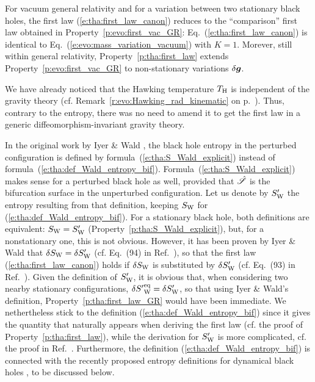 \begin{prop}
\label{p:tha:first_law_GR}
For vacuum general relativity and for a variation between two stationary black holes,
the first law (\ref{e:tha:first_law_canon}) reduces
to the ``comparison'' first law obtained in Property~\ref{p:evo:first_vac_GR}:
Eq.~(\ref{e:tha:first_law_canon}) is identical to
Eq.~(\ref{e:evo:mass_variation_vacuum}) with $K=1$.
Morever, still within general relativity, Property~\ref{p:tha:first_law} extends
Property~\ref{p:evo:first_vac_GR} to non-stationary variations
$\delta\bm{g}$.
\end{prop}

\begin{remark}
We have already noticed that the Hawking temperature $T_{\rm H}$
is independent of the gravity theory
(cf. Remark~\ref{r:evo:Hawking_rad_kinematic} on p.~\pageref{r:evo:Hawking_rad_kinematic}).
Thus, contrary to the entropy, there was no need to amend it to get the first law
in a generic diffeomorphism-invariant gravity theory.
\end{remark}

\begin{remark}
In the original work by Iyer \& Wald \cite{IyerW94},
the black hole entropy in the perturbed
configuration is defined by formula~(\ref{e:tha:S_Wald_explicit})
instead of formula~(\ref{e:tha:def_Wald_entropy_bif}).
Formula~(\ref{e:tha:S_Wald_explicit}) makes
sense for a perturbed black hole as well, provided that $\hat{\mathscr{S}}$
is the bifurcation surface in the unperturbed configuration.
Let us denote by $S'_{\rm W}$ the entropy resulting from that definition,
keeping $S_{\rm W}$ for (\ref{e:tha:def_Wald_entropy_bif}).
For a stationary black hole, both definitions are equivalent:
$S_{\rm W} = S'_{\rm W}$
(Property~\ref{p:tha:S_Wald_explicit}), but, for a nonstationary one,
this is not obvious. However, it has been proven by Iyer \& Wald that
$\delta S_{\rm W} = \delta S'_{\rm W}$
(cf. Eq.~(94) in Ref.~\cite{IyerW94}), so that the first law
(\ref{e:tha:first_law_canon}) holds if $\delta S_{\rm W}$ is substituted
by $\delta S'_{\rm W}$ (cf. Eq.~(93) in Ref.~\cite{IyerW94}).
Given the definition of $S'_{\rm W}$, it is obvious that, when
considering two nearby stationary configurations,
$\delta {S'}_{\rm W}^{\rm eq} =  \delta S'_{\rm W}$,
so that using Iyer \& Wald's definition, Property~\ref{p:tha:first_law_GR}
would have been immediate. We nethertheless stick to the definition
(\ref{e:tha:def_Wald_entropy_bif}) since it gives the quantity that
naturally appears when deriving the
first law (cf. the proof of Property~\ref{p:tha:first_law}), while the
derivation for $S'_{\rm W}$ is more complicated, cf. the proof in Ref.~\cite{IyerW94}.
Furthermore, the definition (\ref{e:tha:def_Wald_entropy_bif}) is connected
with the recently proposed entropy definitions for dynamical black holes
\cite{HollaWZ24,Wald24,VisseY24}, to be discussed below.
\end{remark}


